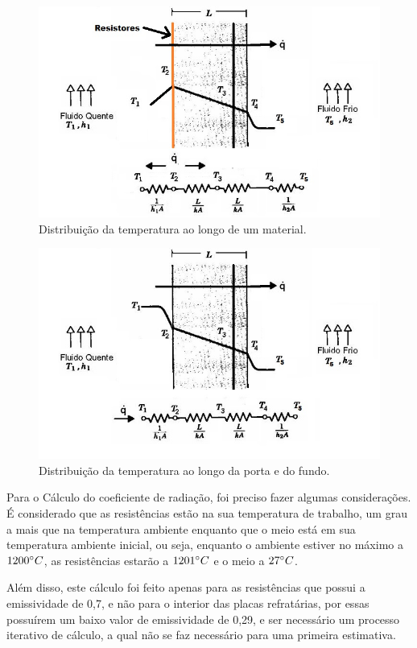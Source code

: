 \begin{figure}[H]
	\centering
	\label{dist_temperatura}
	\includegraphics[keepaspectratio=true,scale=0.85]{figuras/figura15.jpg}
	\caption{Distribuição da temperatura ao longo de um material.}
\end{figure}
\begin{figure}[H]
	\centering
	\label{dist_temperatura}
	\includegraphics[keepaspectratio=true,scale=0.7]{figuras/figura16.jpg}
	\caption{Distribuição da temperatura ao longo da porta e do fundo.}
\end{figure}
Para o Cálculo do coeficiente de radiação, foi preciso fazer algumas considerações. É considerado que as resistências estão na sua temperatura de trabalho, um grau a mais que na temperatura ambiente enquanto que o meio está em sua temperatura ambiente inicial, ou seja, enquanto o ambiente estiver no máximo a $1200\degree C$, as resistências estarão a $1201\degree C$ e o meio a $27\degree C$.

Além disso, este cálculo foi feito apenas para as resistências que possui a emissividade de 0,7, e não para o interior das placas refratárias, por essas possuírem um baixo valor de emissividade de 0,29, e ser necessário um processo iterativo de cálculo, a qual não se faz necessário para uma primeira estimativa.

